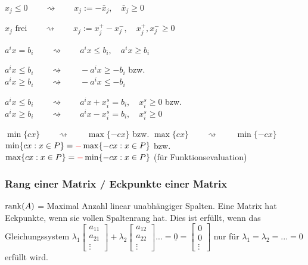    \begin{aufzaehlung}
      \item $x_j \leq 0 \qquad \rightsquigarrow \qquad x_j := -\bar{x}_j, \quad \bar{x}_j \geq 0$
      \item $x_j \text{ frei} \qquad \rightsquigarrow \qquad x_j := x_j^+ - x_j^-, \quad x_j^+, x_j^- \geq 0$
      \item $a^i x = b_i \qquad \rightsquigarrow \qquad a^i x \leq b_i, \quad a^i x \geq b_i$
      \item $a^i x \leq b_i \qquad \rightsquigarrow \qquad -a^i x \geq -b_i$ bzw.\\
            $a^i x \geq b_i \qquad \rightsquigarrow \qquad -a^i x \leq -b_i$
      \item $a^i x \leq b_i \qquad \rightsquigarrow \qquad a^i x + x_i^s = b_i, \quad x_i^s \geq 0$ bzw.\\
            $a^i x \geq b_i \qquad \rightsquigarrow \qquad a^i x - x_i^s = b_i, \quad x_i^s \geq 0$
      \item $\min \{cx\} \qquad \rightsquigarrow \qquad \max \{-cx\}$ \qquad \qquad bzw. \qquad $\max \{cx\} \qquad \rightsquigarrow \qquad \min \{-cx\}$\newline
      $\min \{cx: x \in P\} = \textcolor{red}{-} \max \{-cx: x \in P\}$ \quad bzw. \quad $\max \{cx: x \in P\} = \textcolor{red}{-} \min \{-cx: x \in P\}$ (für Funktionsevaluation)
    \end{aufzaehlung}
  	
	
	\subsubsection{Rang einer Matrix / Eckpunkte einer Matrix}
	  $\operatorname{rank}(A)$ = Maximal Anzahl linear unabhängiger Spalten. Eine Matrix hat Eckpunkte, wenn sie vollen Spaltenrang hat. Dies ist erfüllt, wenn das Gleichungssystem $\lambda_1 \begin{bmatrix}
   	  a_{11}\\a_{21}\\ \vdots
 	  \end{bmatrix} + 
 	  \lambda_2\begin{bmatrix}
   	  a_{12}\\a_{22}\\ \vdots
 	  \end{bmatrix} ...
 	  = \underline{0} = \begin{bmatrix}
 	     	  0\\0\\ \vdots
 	  \end{bmatrix}$ nur für $\lambda_1 = \lambda_2 = ... = 0$ erfüllt wird.
 	  
